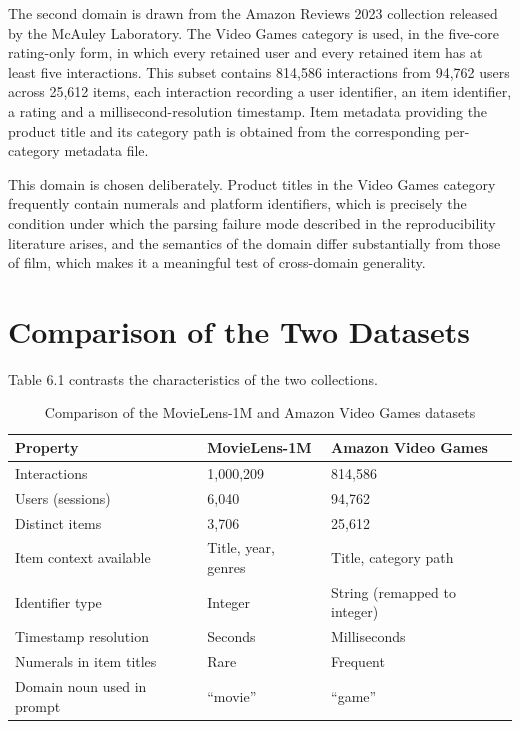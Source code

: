 \documentclass[12pt,a4paper,oneside]{report}
\begin{document}
The second domain is drawn from the Amazon Reviews 2023 collection released by
the McAuley Laboratory. The Video Games category is used, in the five-core
rating-only form, in which every retained user and every retained item has at
least five interactions. This subset contains 814{,}586 interactions from
94{,}762 users across 25{,}612 items, each interaction recording a user
identifier, an item identifier, a rating and a millisecond-resolution timestamp.
Item metadata providing the product title and its category path is obtained from
the corresponding per-category metadata file.

This domain is chosen deliberately. Product titles in the Video Games category
frequently contain numerals and platform identifiers, which is precisely the
condition under which the parsing failure mode described in the reproducibility
literature arises, and the semantics of the domain differ substantially from
those of film, which makes it a meaningful test of cross-domain generality.

\section{Comparison of the Two Datasets}

Table 6.1 contrasts the characteristics of the two collections.

\begin{table}[h]
\centering
\small
\caption{Comparison of the MovieLens-1M and Amazon Video Games datasets}
\begin{tabularx}{\textwidth}{@{}p{3.6cm}XX@{}}
\toprule
\textbf{Property} & \textbf{MovieLens-1M} & \textbf{Amazon Video Games}\\
\midrule
Interactions & 1{,}000{,}209 & 814{,}586\\
Users (sessions) & 6{,}040 & 94{,}762\\
Distinct items & 3{,}706 & 25{,}612\\
Item context available & Title, year, genres & Title, category path\\
Identifier type & Integer & String (remapped to integer)\\
Timestamp resolution & Seconds & Milliseconds\\
Numerals in item titles & Rare & Frequent\\
Domain noun used in prompt & ``movie'' & ``game''\\
\bottomrule
\end{tabularx}
\end{table}
\end{document}
